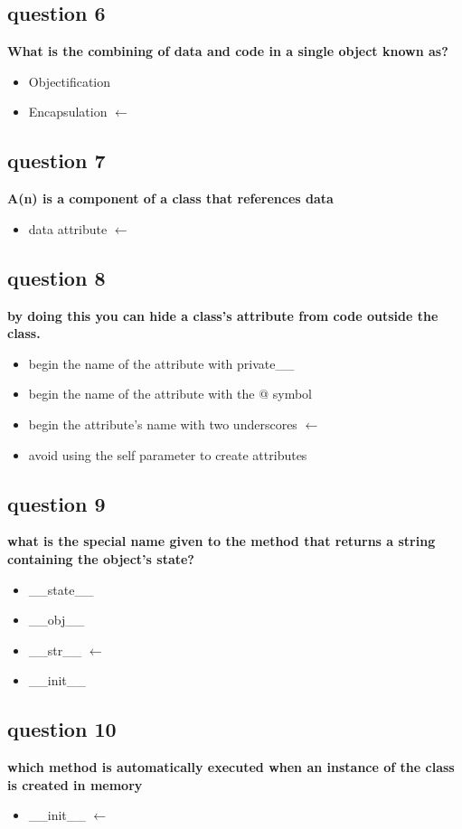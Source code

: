 \documentclass[10pt]{article}
\begin{document}
\subsection*{question 6}
\textbf{What is the combining of data and code in a single object known as?}
\begin{itemize}
\item{Objectification}
\item Encapsulation $\leftarrow$
\end{itemize}
\subsection*{question 7}
\textbf{A(n) is a component of a class that references data}
\begin{itemize}
\item data attribute $\leftarrow$
\end{itemize}
\subsection*{question 8}
\textbf{by doing this you can hide a class's attribute from code outside the class.}
\begin{itemize}
\item begin the name of the attribute with private\_\_
\item begin the name of the attribute with the @ symbol
\item begin the attribute's name with two underscores $\leftarrow$
\item avoid using the self parameter to create attributes
\end{itemize}
\subsection*{question 9}
\textbf{what is the special name given to the method that returns a string containing the object's state?}
\begin{itemize}
   \item \_\_state\_\_      
\item \_\_obj\_\_
\item \_\_str\_\_ $\leftarrow$
\item \_\_init\_\_
\end{itemize}
\subsection*{question 10}
\textbf{which method is automatically executed when an instance of the class is created in memory}
\begin{itemize}
\item \_\_init\_\_ $\leftarrow$
\end{itemize}
\end{document}
